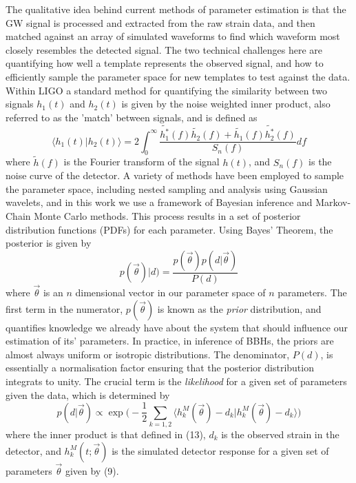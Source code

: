 \documentclass[11pt]{article}
\begin{document}
The qualitative idea behind current methods of parameter estimation is that the GW signal is processed and extracted from the raw strain data, and then matched against an array of simulated waveforms to find which waveform most closely resembles the detected signal. The two technical challenges here are quantifying how well a template represents the observed signal, and how to efficiently sample the parameter space for new templates to test against the data. Within LIGO a standard method for quantifying the similarity between two signals $h_1(t)$ and $h_2(t)$ is given by the noise weighted inner product, also referred to as the 'match' between signals, and is defined as
\begin{equation}
\langle h_1(t) \vert h_2(t) \rangle=2\int_{0}^{\infty}\frac{\tilde{h_1^*}(f)\tilde{h_2}(f)+\tilde{h_1}(f)\tilde{h_2^*}(f)}{S_n(f)}df 
\end{equation}
where $\tilde{h}(f)$ is the Fourier transform of the signal $h(t)$, and $S_n(f)$ is the noise curve of the detector\cite{oldest_pe}. A variety of methods have been employed to sample the parameter space, including nested sampling\cite{pe2} and analysis using Gaussian wavelets\cite{props}, and in this work we use a framework of Bayesian inference and Markov-Chain Monte Carlo methods\cite{inj}\cite{pe}\cite{pe4}. This process results in a set of posterior distribution functions (PDFs) for each parameter. Using Bayes' Theorem, the posterior is given by
\begin{equation}
p(\vec{\theta})|d)=\frac{p(\vec{\theta})p(d|\vec{\theta})}{P(d)}
\end{equation}
where $\vec{\theta}$ is an $n$ dimensional vector in our parameter space of $n$ parameters\cite{pe2}. The first term in the numerator, $p(\vec{\theta})$ is known as the \textit{prior} distribution, and quantifies knowledge we already have about the system that should influence our estimation of its' parameters. In practice, in inference of BBHs, the priors are almost always uniform or isotropic distributions. The denominator, $P(d)$, is essentially a normalisation factor ensuring that the posterior distribution integrats to unity. The crucial term is the \textit{likelihood} for a given set of parameters given the data, which is determined by
\begin{equation}
p(d|\vec{\theta})\propto \exp\bigg(-\frac{1}{2}\sum_{k=1,2}\Big \langle h^M_k(\vec{\theta})-d_k \big\vert h^M_k(\vec{\theta})-d_k \Big \rangle\bigg)
\end{equation}
where the inner product is that defined in (13), $d_k$ is the observed strain in the detector, and $h_k^M(t;\vec{\theta})$ is the simulated detector response for a given set of parameters $\vec{\theta}$ given by (9).
\end{document}
